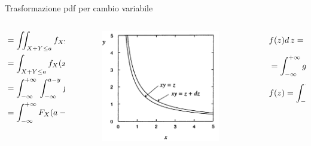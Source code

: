 \documentclass[asd-beamer.tex]{subfiles}
\begin{document}
\begin{frame}{Trasformazione pdf per cambio variabile}
\begin{columns}[T]
\begin{column}{0.45\textwidth}
\begin{align*}
	&=\iint_{X+Y\leq a}f_{XY}(x,y)\,dx\,dy\\
	&=\int_{X+Y\leq a}f_X(x)f_Y(y)\,dx\,dy\\
	&=\int_{-\infty}^{+\infty}{}\int_{-\infty}^{a-y}f_X(x)\,dxf_Y(y)\,dy\\
	&=\int_{-\infty}^{+\infty}{}F_X(a-y)f_Y(y)\,dy:\ f_Z(a)=\frac{d}{d a}F_Z(a)
\end{align*}
\end{column}
\begin{column}{0.55\textwidth}
		\begin{columns}[T]
			\begin{column}{0.3\textwidth}
				\begin{figure}
					\centering
					\includegraphics[keepaspectratio,width=0.9\textwidth]{figures/cowan/probability/RVprod}
					\label{fig:RVprod}
				\end{figure}
			\end{column}
			\begin{column}{0.7\textwidth}
				\begin{align*}
					&f(z)d\,z=\int_{d\,S}g(x)h(y)d\,xd\,y\\
					&=\int_{-\infty}^{+\infty}{}g(x)d\,x\int_{\frac{z}{|x|}}^{\frac{z+d\,s}{|x|}}h(y)d\,y\\
					&f(z)=\int_{-\infty}^{+\infty}{}g(\frac{z}{y})h(y)\frac{d\,y}{|y|}
				\end{align*}
			\end{column}
		\end{columns}
\end{column}
\end{columns}
\end{frame}
\end{document}
